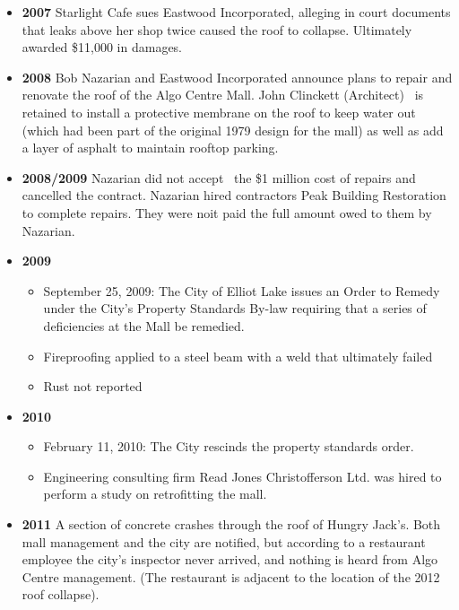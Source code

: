 \documentclass[12pt]{article}
\begin{document}
\begin{itemize}
    \item \textbf{\textbf{2007}}
Starlight Cafe sues Eastwood Incorporated, alleging in court documents that leaks above her shop twice caused the roof to collapse. Ultimately awarded \$11,000 in damages.

    \item \textbf{\textbf{2008}}
Bob Nazarian and Eastwood Incorporated announce plans to repair and renovate the roof of the Algo Centre Mall. John Clinckett (Architect)  is retained to install a protective membrane on the roof to keep water out (which had been part of the original 1979 design for the mall) as well as add a layer of asphalt to maintain rooftop parking.

    \item \textbf{\textbf{2008/2009}}
Nazarian did not accept  the \$1 million cost of repairs and cancelled the contract. Nazarian hired contractors Peak Building Restoration to complete repairs. They were noit paid the full amount owed to them by Nazarian. 

    \item \textbf{\textbf{2009}}
    \begin{itemize}
        \item September 25, 2009: The City of Elliot Lake issues an Order to Remedy under the City’s Property Standards By-law requiring that a series of deficiencies at the Mall be remedied.
        \item Fireproofing applied to a steel beam with a weld that ultimately failed
        \item Rust not reported
    \end{itemize}
    \item \textbf{\textbf{2010}}
    \begin{itemize}
        \item February 11, 2010: The City rescinds the property standards order.
        \item Engineering consulting firm Read Jones Christofferson Ltd. was hired to perform a study on retrofitting the mall. 
    \end{itemize}
    \item \textbf{\textbf{2011}}
A section of concrete crashes through the roof of Hungry Jack’s. Both mall management and the city are notified, but according to a restaurant employee the city’s inspector never arrived, and nothing is heard from Algo Centre management. (The restaurant is adjacent to the location of the 2012 roof collapse).


\end{itemize}
\end{document}
